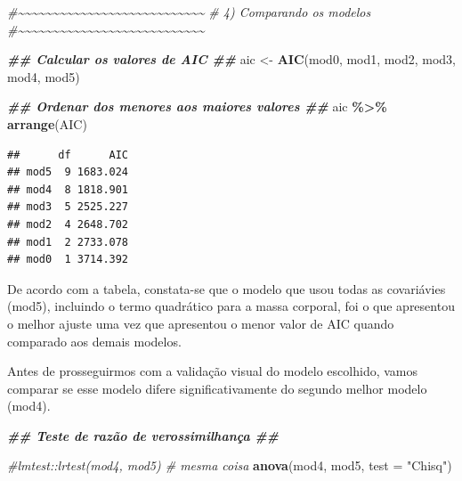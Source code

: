 \documentclass[
]{book}
\newenvironment{Shaded}{\begin{snugshade}}{\end{snugshade}}
\newcommand{\AttributeTok}[1]{\textcolor[rgb]{0.13,0.29,0.53}{#1}}
\newcommand{\CommentTok}[1]{\textcolor[rgb]{0.56,0.35,0.01}{\textit{#1}}}
\newcommand{\DocumentationTok}[1]{\textcolor[rgb]{0.56,0.35,0.01}{\textbf{\textit{#1}}}}
\newcommand{\FunctionTok}[1]{\textcolor[rgb]{0.13,0.29,0.53}{\textbf{#1}}}
\newcommand{\NormalTok}[1]{#1}
\newcommand{\OtherTok}[1]{\textcolor[rgb]{0.56,0.35,0.01}{#1}}
\newcommand{\SpecialCharTok}[1]{\textcolor[rgb]{0.81,0.36,0.00}{\textbf{#1}}}
\newcommand{\StringTok}[1]{\textcolor[rgb]{0.31,0.60,0.02}{#1}}
\begin{document}
\begin{Shaded}
\begin{Highlighting}[]
\CommentTok{\#\textasciitilde{}\textasciitilde{}\textasciitilde{}\textasciitilde{}\textasciitilde{}\textasciitilde{}\textasciitilde{}\textasciitilde{}\textasciitilde{}\textasciitilde{}\textasciitilde{}\textasciitilde{}\textasciitilde{}\textasciitilde{}\textasciitilde{}\textasciitilde{}\textasciitilde{}\textasciitilde{}\textasciitilde{}\textasciitilde{}\textasciitilde{}\textasciitilde{}\textasciitilde{}\textasciitilde{}\textasciitilde{}\textasciitilde{}\textasciitilde{}}
\CommentTok{\# 4) Comparando os modelos}
\CommentTok{\#\textasciitilde{}\textasciitilde{}\textasciitilde{}\textasciitilde{}\textasciitilde{}\textasciitilde{}\textasciitilde{}\textasciitilde{}\textasciitilde{}\textasciitilde{}\textasciitilde{}\textasciitilde{}\textasciitilde{}\textasciitilde{}\textasciitilde{}\textasciitilde{}\textasciitilde{}\textasciitilde{}\textasciitilde{}\textasciitilde{}\textasciitilde{}\textasciitilde{}\textasciitilde{}\textasciitilde{}\textasciitilde{}\textasciitilde{}\textasciitilde{}}

\DocumentationTok{\#\# Calcular os valores de AIC \#\#}
\NormalTok{aic }\OtherTok{\textless{}{-}} \FunctionTok{AIC}\NormalTok{(mod0, mod1, mod2, mod3, mod4, mod5)}


\DocumentationTok{\#\# Ordenar dos menores aos maiores valores \#\#}
\NormalTok{aic }\SpecialCharTok{\%\textgreater{}\%} \FunctionTok{arrange}\NormalTok{(AIC)}
\end{Highlighting}
\end{Shaded}

\begin{verbatim}
##      df      AIC
## mod5  9 1683.024
## mod4  8 1818.901
## mod3  5 2525.227
## mod2  4 2648.702
## mod1  2 2733.078
## mod0  1 3714.392
\end{verbatim}

De acordo com a tabela, constata-se que o modelo que usou todas as covariávies (mod5), incluindo o termo quadrático para a massa corporal, foi o que apresentou o melhor ajuste uma vez que apresentou o menor valor de AIC quando comparado aos demais modelos.

Antes de prosseguirmos com a validação visual do modelo escolhido, vamos comparar se esse modelo difere significativamente do segundo melhor modelo (mod4).

\begin{Shaded}
\begin{Highlighting}[]
\DocumentationTok{\#\# Teste de razão de verossimilhança \#\#}

\CommentTok{\#lmtest::lrtest(mod4, mod5) \# mesma coisa}
\FunctionTok{anova}\NormalTok{(mod4, mod5, }\AttributeTok{test =} \StringTok{"Chisq"}\NormalTok{)}
\end{Highlighting}
\end{Shaded}
\end{document}
